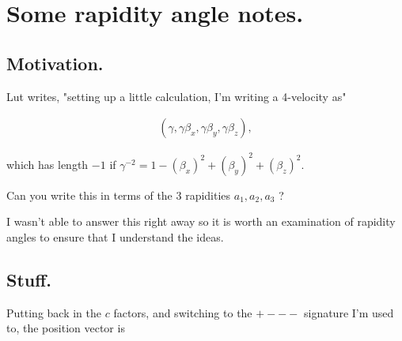 
%
%




\chapter{Some rapidity angle notes. }
\label{chap:rapidity}
\date{ Dec 18, 2008.  $RCSfile: rapidity.tex,v $ Last $Revision: 1.8 $ $Date: 2009/06/14 23:51:45 $ }

%


\section{Motivation. }

Lut writes, "setting up a little calculation, I'm writing a 4-velocity as"
 
\begin{align*}
( \gamma, \gamma \beta_x, \gamma \beta_y, \gamma \beta_z ),
\end{align*}
 
which has length $-1$ if $\gamma^{-2} = 1 - (\beta_x)^2+(\beta_y)^2+(\beta_z)^2$.
 
Can you write this in terms of the 3 rapidities $a_1, a_2, a_3$ ?

I wasn't able to answer this right away so it is worth an examination
of rapidity angles to ensure that I understand the ideas.

\section{Stuff. }

Putting back in the $c$ factors, and switching to the $+---$ signature I'm used to, the position
vector is

